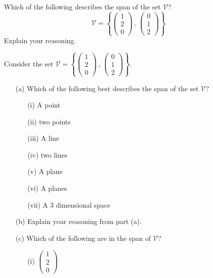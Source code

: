 \begin{problem}
    Which of the following describes the span of the set $\mathcal{V}$?
    \[ \mathcal{V} = \left\{ \begin{pmatrix} 1 \\ 2\\ 0 \end{pmatrix} \, , \, \begin{pmatrix}
        0 \\ 1\\ 2\end{pmatrix} \right\} \]
    Explain your reasoning.
\end{problem}

\begin{problem}
    Consider the set $\mathcal{V} = \left\{ \begin{pmatrix} 1 \\ 2 \\ 0\end{pmatrix} \, , \, \begin{pmatrix}
        0 \\ 1 \\ 2\end{pmatrix} \right\}$.
    \begin{enumerate}
        \item[(a)] Which of the following best describes the span of the set
            $\mathcal{V}$?
            \begin{itemize}
                \item[(i)] A point
                \item[(ii)] two points
                \item[(iii)] A line
                \item[(iv)] two lines
                \item[(v)] A plane
                \item[(vi)] A planes
                \item[(vii)] A 3 dimensional space
            \end{itemize}
        \item[(b)] Explain your reasoning from part (a).
        \item[(c)] Which of the following are in the span of $\mathcal{V}$?
            \begin{itemize}
                \item[(i)] $\begin{pmatrix}1 \\ 2 \\ 0\end{pmatrix}$

\end{itemize}
\end{enumerate}
\end{problem}

